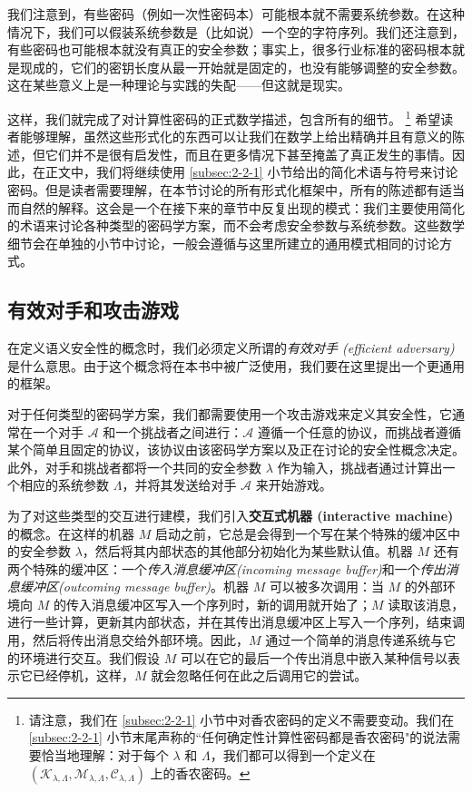 我们注意到，有些密码（例如一次性密码本）可能根本就不需要系统参数。在这种情况下，我们可以假装系统参数是（比如说）一个空的字符序列。我们还注意到，有些密码也可能根本就没有真正的安全参数；事实上，很多行业标准的密码根本就是现成的，它们的密钥长度从最一开始就是固定的，也没有能够调整的安全参数。这在某些意义上是一种理论与实践的失配——但这就是现实。

这样，我们就完成了对计算性密码的正式数学描述，包含所有的细节。
\footnote{
请注意，我们在 \ref{subsec:2-2-1} 小节中对香农密码的定义不需要变动。我们在 \ref{subsec:2-2-1} 小节末尾声称的``任何确定性计算性密码都是香农密码"的说法需要恰当地理解：对于每个 $\lambda$ 和 $\Lambda$，我们都可以得到一个定义在 $(\mathcal{K}_{\lambda,\Lambda},\mathcal{M}_{\lambda,\Lambda},\mathcal{C}_{\lambda,\Lambda})$ 上的香农密码。
}
希望读者能够理解，虽然这些形式化的东西可以让我们在数学上给出精确并且有意义的陈述，但它们并不是很有启发性，而且在更多情况下甚至掩盖了真正发生的事情。因此，在正文中，我们将继续使用 \ref{subsec:2-2-1} 小节给出的简化术语与符号来讨论密码。但是读者需要理解，在本节讨论的所有形式化框架中，所有的陈述都有适当而自然的解释。这会是一个在接下来的章节中反复出现的模式：我们主要使用简化的术语来讨论各种类型的密码学方案，而不会考虑安全参数与系统参数。这些数学细节会在单独的小节中讨论，一般会遵循与这里所建立的通用模式相同的讨论方式。

\subsection{有效对手和攻击游戏}

在定义语义安全性的概念时，我们必须定义所谓的\emph{有效对手 (efficient adversary)}是什么意思。由于这个概念将在本书中被广泛使用，我们要在这里提出一个更通用的框架。

对于任何类型的密码学方案，我们都需要使用一个攻击游戏来定义其安全性，它通常在一个对手 $\mathcal{A}$ 和一个挑战者之间进行：$\mathcal{A}$ 遵循一个任意的协议，而挑战者遵循某个简单且固定的协议，该协议由该密码学方案以及正在讨论的安全性概念决定。此外，对手和挑战者都将一个共同的安全参数 $\lambda$ 作为输入，挑战者通过计算出一个相应的系统参数 $\Lambda$，并将其发送给对手 $\mathcal{A}$ 来开始游戏。

为了对这些类型的交互进行建模，我们引入\textbf{交互式机器 (interactive machine)}的概念。在这样的机器 $M$ 启动之前，它总是会得到一个写在某个特殊的缓冲区中的安全参数 $\lambda$，然后将其内部状态的其他部分初始化为某些默认值。机器 $M$ 还有两个特殊的缓冲区：一个\emph{传入消息缓冲区(incoming message buffer)}和一个\emph{传出消息缓冲区(outcoming message buffer)}。机器 $M$ 可以被多次调用：当 $M$ 的外部环境向 $M$ 的传入消息缓冲区写入一个序列时，新的调用就开始了；$M$ 读取该消息，进行一些计算，更新其内部状态，并在其传出消息缓冲区上写入一个序列，结束调用，然后将传出消息交给外部环境。因此，$M$ 通过一个简单的消息传递系统与它的环境进行交互。我们假设 $M$ 可以在它的最后一个传出消息中嵌入某种信号以表示它已经停机，这样，$M$ 就会忽略任何在此之后调用它的尝试。

